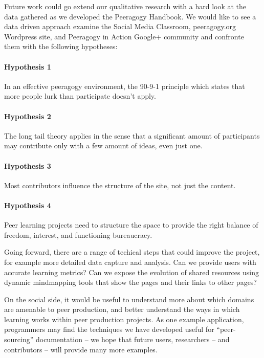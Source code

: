 \documentclass{acm_proc_article-sp}
\begin{document}
Future work could go extend our qualitative research with a hard look
at the data gathered as we developed the Peeragogy Handbook.  We would
like to see a data driven approach examine the Social Media Classroom,
peeragogy.org Wordpress site, and Peeragogy in Action Google+
community and confronte them with the following hypotheses:

\paragraph{Hypothesis 1}
In an effective peeragogy environment, the 90-9-1 principle which
states that more people lurk than participate doesn't apply.

\paragraph{Hypothesis 2}
The long tail theory applies in the sense that a significant amount of
participants may contribute only with a few amount of ideas, even just
one.

\paragraph{Hypothesis 3}
Most contributors influence the structure of the site, not just the
content.

\paragraph{Hypothesis 4}
Peer learning projects need to structure the space to provide the
right balance of freedom, interest, and functioning bureaucracy.

Going forward, there are a range of techical steps that could improve
the project, for example more detailed data capture and analysis.  Can
we provide users with accurate learning metrics?  Can we expose the
evolution of shared resources using dynamic mindmapping tools that
show the pages and their links to other pages?

On the social side, it would be useful to understand more about which
domains are amenable to peer production, and better understand the
ways in which learning works within peer production projects.  As one
example application, programmers may find the techniques we have
developed useful for ``peer-sourcing'' documentation -- we hope that
future users, researchers -- and contributors -- will provide many
more examples.

\end{document}
